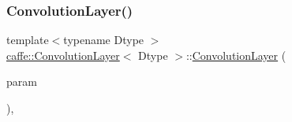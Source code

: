 \subsubsection{\texorpdfstring{Convolution\+Layer()}{ConvolutionLayer()}\hspace{0.1cm}{\footnotesize\ttfamily [1/2]}}
{\footnotesize\ttfamily template$<$typename Dtype $>$ \\
\mbox{\hyperlink{classcaffe_1_1_convolution_layer}{caffe\+::\+Convolution\+Layer}}$<$ Dtype $>$\+::\mbox{\hyperlink{classcaffe_1_1_convolution_layer}{Convolution\+Layer}} (\begin{DoxyParamCaption}\item[{const \mbox{\hyperlink{classcaffe_1_1_layer_parameter}{Layer\+Parameter}} \&}]{param }\end{DoxyParamCaption})\hspace{0.3cm}{\ttfamily [inline]}, {\ttfamily [explicit]}}


